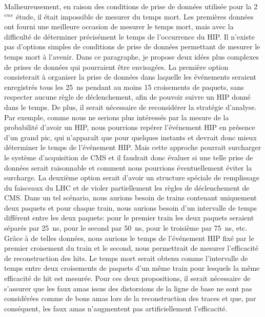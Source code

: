 Malheureusement, en raison des conditions de prise de données utilisée pour la 2$^{eme}$ étude, il était impossible de mesurer du temps mort. Les premières données ont fourni une meilleure occasion de mesurer le temps mort, mais avec la difficulté de déterminer précisément le temps de l'occurrence du HIP. Il n’existe pas d’options simples de conditions de prise de données permettant de mesurer le temps mort à l’avenir. Dans ce paragraphe, je propose deux idées plus complexes de prises de données qui pourraient être envisagées. La première option consisterait à organiser la prise de données dans laquelle les événements seraient enregistrés tous les 25~ns pendant au moins 15 croisements de paquets, sans respecter aucune règle de déclenchement, afin de pouvoir suivre un HIP donné dans le temps. De plus, il serait nécessaire de reconsidérer la stratégie d’analyse. Par exemple, comme nous ne serions plus intéressés par la mesure de la probabilité d'avoir un HIP, nous pourrions repérer l’événement HIP en présence d’un grand pic, qui n’apparaît que pour quelques instants et devrait donc mieux déterminer le temps de l’événement HIP. Mais cette approche pourrait surcharger le système d'acquisition de CMS et il faudrait donc évaluer si une telle prise de données serait raisonnable et comment nous pourrions éventuellement éviter la surcharge. La deuxième option serait d'avoir un structure spéciale de remplissage du faisceaux du LHC et de violer partiellement les règles de déclenchement de CMS. Dans un tel scénario, nous aurions besoin de trains contenant uniquement deux paquets et pour chaque train, nous aurions besoin d'un intervalle de temps différent entre les deux paquets: pour le premier train les deux paquets seraient séparés par 25~ns, pour le second par 50~ns, pour le troisième par 75~ns, etc. Grâce à de telles données, nous aurions le temps de l'événement HIP fixé par le premier croisement du train et le second, nous permettrait de mesurer l'efficacité de reconstruction des hits. Le temps mort serait obtenu  comme l'intervalle de temps entre deux croisements de paquets d'un  même train pour lesquels la même efficacité de hit est mesurée. Pour ces deux propositions, il serait nécessaire de s'assurer que les faux amas issus des distorsions de la ligne de base ne sont pas considérées comme de bons amas lors de la reconstruction  des traces et que, par conséquent, les faux amas n'augmentent pas artificiellement l'efficacité.


